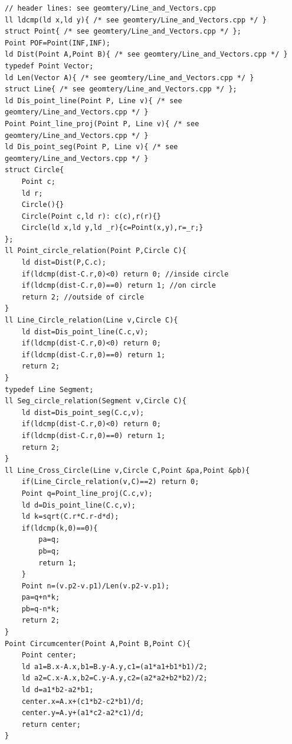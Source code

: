 
\begin{lstlisting}[breaklines=true]
// header lines: see geomtery/Line_and_Vectors.cpp
ll ldcmp(ld x,ld y){ /* see geomtery/Line_and_Vectors.cpp */ }
struct Point{ /* see geomtery/Line_and_Vectors.cpp */ };
Point POF=Point(INF,INF);
ld Dist(Point A,Point B){ /* see geomtery/Line_and_Vectors.cpp */ }
typedef Point Vector;
ld Len(Vector A){ /* see geomtery/Line_and_Vectors.cpp */ }
struct Line{ /* see geomtery/Line_and_Vectors.cpp */ };
ld Dis_point_line(Point P, Line v){ /* see geomtery/Line_and_Vectors.cpp */ }
Point Point_line_proj(Point P, Line v){ /* see geomtery/Line_and_Vectors.cpp */ }
ld Dis_point_seg(Point P, Line v){ /* see geomtery/Line_and_Vectors.cpp */ }
struct Circle{
    Point c;
    ld r;
    Circle(){}
    Circle(Point c,ld r): c(c),r(r){}
    Circle(ld x,ld y,ld _r){c=Point(x,y),r=_r;}
};
ll Point_circle_relation(Point P,Circle C){
    ld dist=Dist(P,C.c);
    if(ldcmp(dist-C.r,0)<0) return 0; //inside circle
    if(ldcmp(dist-C.r,0)==0) return 1; //on circle
    return 2; //outside of circle
}
ll Line_Circle_relation(Line v,Circle C){
    ld dist=Dis_point_line(C.c,v);
    if(ldcmp(dist-C.r,0)<0) return 0;
    if(ldcmp(dist-C.r,0)==0) return 1;
    return 2;
}
typedef Line Segment;
ll Seg_circle_relation(Segment v,Circle C){
    ld dist=Dis_point_seg(C.c,v);
    if(ldcmp(dist-C.r,0)<0) return 0;
    if(ldcmp(dist-C.r,0)==0) return 1;
    return 2;
}
ll Line_Cross_Circle(Line v,Circle C,Point &pa,Point &pb){
    if(Line_Circle_relation(v,C)==2) return 0;
    Point q=Point_line_proj(C.c,v);
    ld d=Dis_point_line(C.c,v);
    ld k=sqrt(C.r*C.r-d*d);
    if(ldcmp(k,0)==0){
        pa=q;
        pb=q;
        return 1;
    }
    Point n=(v.p2-v.p1)/Len(v.p2-v.p1);
    pa=q+n*k;
    pb=q-n*k;
    return 2;
}
Point Circumcenter(Point A,Point B,Point C){
    Point center;
    ld a1=B.x-A.x,b1=B.y-A.y,c1=(a1*a1+b1*b1)/2;
    ld a2=C.x-A.x,b2=C.y-A.y,c2=(a2*a2+b2*b2)/2;
    ld d=a1*b2-a2*b1;
    center.x=A.x+(c1*b2-c2*b1)/d;
    center.y=A.y+(a1*c2-a2*c1)/d;
    return center;
}
\end{lstlisting}

